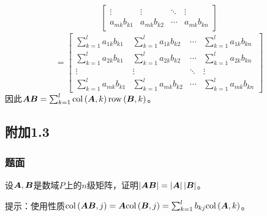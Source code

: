 \documentclass{beamer}
\begin{document}
\begin{frame}[allowframebreaks]
\begin{align*}
\begin{bmatrix}
            \vdots       & \vdots       & \ddots & \vdots       \\
            a_{mk}b_{k1} & a_{mk}b_{k2} & \cdots & a_{mk}b_{kn}
        \end{bmatrix}
    \end{align*}
    \begin{equation*}
        =
        \begin{bmatrix}
            \sum_{k=1}^la_{1k}b_{k1} & \sum_{k=1}^la_{1k}b_{k2} & \cdots & \sum_{k=1}^la_{1k}b_{kn} \\
            \sum_{k=1}^la_{2k}b_{k1} & \sum_{k=1}^la_{2k}b_{k2} & \cdots & \sum_{k=1}^la_{2k}b_{kn} \\
            \vdots                   & \vdots                   & \ddots & \vdots                   \\
            \sum_{k=1}^la_{mk}b_{k1} & \sum_{k=1}^la_{mk}b_{k2} & \cdots & \sum_{k=1}^la_{mk}b_{kn}
        \end{bmatrix}
    \end{equation*}
    因此\(\boldsymbol{A}\boldsymbol{B}=\sum_{k=1}^l\mathrm{col}\left( \boldsymbol{A},k \right)\mathrm{row}\left( \boldsymbol{B},k \right)\)。

\end{frame}

\subsection*{附加1.3}

\begin{frame}
\frametitle{题面}

    设\(\boldsymbol{A},\boldsymbol{B}\)是数域\(P\)上的\(n\)级矩阵，证明\(\left|\boldsymbol{A}\boldsymbol{B} \right|=\left|\boldsymbol{A} \right|\left|\boldsymbol{B} \right|\)。

    提示：使用性质\(\mathrm{col}\left( \boldsymbol{A}\boldsymbol{B},j \right)=\boldsymbol{A}\mathrm{col}\left( \boldsymbol{B},j \right)=\sum_{k=1}^lb_{kj}\mathrm{col}\left( \boldsymbol{A},k \right)\)。

\end{frame}
\end{document}
